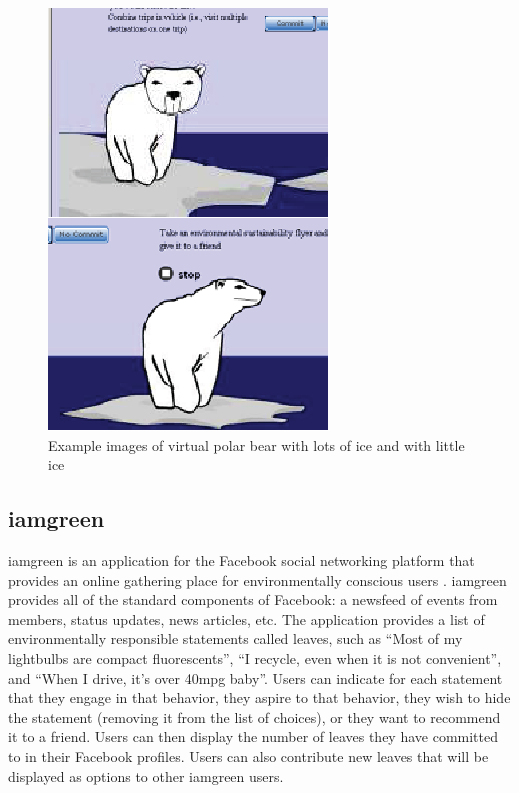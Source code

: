 \begin{figure}[htbp]
	\begin{center}
		\includegraphics{figures/final/virtual-polar-bear}
		\caption{Example images of virtual polar bear with lots of ice and with little ice}
		\label{fig:virtual-polar-bear}
 	\end{center}
\end{figure}

\subsection{iamgreen}
\label{iamgreen}

iamgreen is an application for the Facebook social networking platform that provides an online gathering place for environmentally conscious users \cite{iamgreen-website}. iamgreen provides all of the standard components of Facebook: a newsfeed of events from members, status updates, news articles, etc. The application provides a list of environmentally responsible statements called leaves, such as ``Most of my lightbulbs are compact fluorescents'', ``I recycle, even when it is not convenient'', and ``When I drive, it's over 40mpg baby''. Users can indicate for each statement that they engage in that behavior, they aspire to that behavior, they wish to hide the statement (removing it from the list of choices), or they want to recommend it to a friend. Users can then display the number of leaves they have committed to in their Facebook profiles. Users can also contribute new leaves that will be displayed as options to other iamgreen users.

